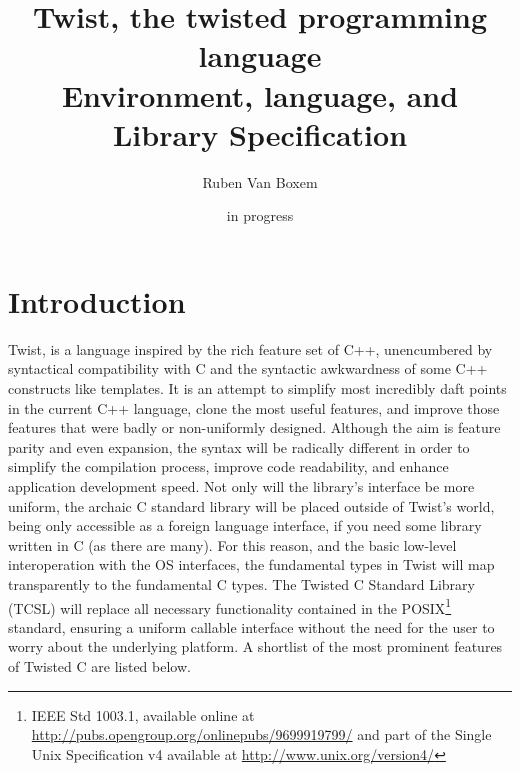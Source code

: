 \documentclass[a4paper,11pt]{report}
\title{Twist, the twisted programming language\\Environment, language, and Library Specification}
\date{in progress}
\author{Ruben Van Boxem}
\begin{document}
\maketitle

\tableofcontents
\thispagestyle{empty}

\chapter{Introduction}

Twist, is a language inspired by the rich feature set of C++, unencumbered by syntactical compatibility with C and the syntactic awkwardness of some C++ constructs like templates.
It is an attempt to simplify most incredibly daft points in the current C++ language, clone the most useful features, and improve those features that were badly or non-uniformly designed.
Although the aim is feature parity and even expansion, the syntax will be radically different in order to simplify the compilation process, improve code readability, and enhance application development speed.
Not only will the library's interface be more uniform, the archaic C standard library will be placed outside of Twist’s world, being only accessible as a foreign language interface, if you need some library written in C (as there are many).
For this reason, and the basic low-level interoperation with the OS interfaces, the fundamental types in Twist will map transparently to the fundamental C types.
The Twisted C Standard Library (TCSL) will replace all necessary functionality contained in the POSIX\footnote{IEEE Std 1003.1, available online at \url{http://pubs.opengroup.org/onlinepubs/9699919799/} and part of the Single Unix Specification v4 available at \url{http://www.unix.org/version4/}} standard, ensuring a uniform callable interface without the need for the user to worry about the underlying platform.
A shortlist of the most prominent features of Twisted C are listed below.
\end{document}
